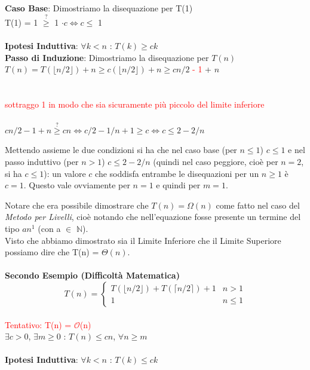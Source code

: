 \documentclass[../cheatSheetAlgoritmi.tex]{subfiles}
\begin{document}
\textbf{Caso Base}: Dimostriamo la disequazione per T(1)\\
T(1) = 1 $\stackrel{?}{\geq}$ 1 $\cdot c \iff c \leq$ 1\\\\
\textbf{Ipotesi Induttiva}: $\forall k < n$ : $T(k) \geq ck$\\
\textbf{Passo di Induzione}: Dimostriamo la disequazione per $T(n)$\\
$T(n) =  T(\lfloor n/2 \rfloor) + n \geq c( \lfloor n/2 \rfloor) + n \geq cn/2$ \textcolor{red}{- 1} + $n$\\\\\\
\textcolor{red}{sottraggo 1 in modo che sia sicuramente più piccolo del limite inferiore} \\\\
$cn/2 - 1 + n \stackrel{?}{\geq} cn \iff c/2 - 1/n + 1 \geq c \iff c \leq 2 - 2/n$
\newpage
\begin{flushleft}
Mettendo assieme le due condizioni si ha che nel caso base (per $n \leq 1$) $c \leq 1$ e nel passo induttivo (per $n > 1$) $c \leq 2 - 2/n$ (quindi nel caso peggiore, cioè per $n = 2$, si ha $c \leq 1$): un valore $c$ che soddisfa entrambe le disequazioni per un $n \geq 1$ è $c = 1$. Questo vale ovviamente per $n = 1$ e quindi per $m = 1$.
\end{flushleft}
Notare che era possibile dimostrare che $T(n) = \Omega(n)$ come fatto nel caso del \emph{Metodo per Livelli}, cioè notando che nell'equazione fosse presente un termine del tipo  $an^{1}$ (con a $\in$ $\mathbb{N}$).\\
Visto che abbiamo dimostrato sia il Limite Inferiore che il Limite Superiore possiamo dire che T(n) = $\Theta(n)$.\\\\
\textbf{Secondo Esempio (Difficoltà Matematica)}
	\begin{equation*}
  		T(n)=\begin{cases}
    		T(\lfloor n/2 \rfloor) + T(\lceil n/2 \rceil) + 1 & \text{$n > 1$}\\
    		1 & \text{$n \leq 1$}
  		\end{cases}
	\end{equation*}
\hfill\\
\textcolor{red}{Tentativo: T(n) = $\mathcal{O}$(n)}\\
$\exists c > 0$, $\exists m \geq 0$ : $T(n) \leq cn$, $\forall n \geq m$\\\\
\textbf{Ipotesi Induttiva}: $\forall k < n$ : $T(k) \leq ck$\\
\end{document}
